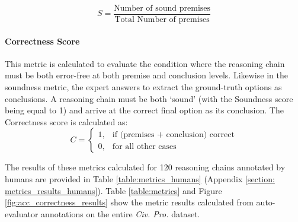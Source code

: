 \[
S = \frac{\text{Number of sound premises}}{\text{Total Number of premises}}
\]

\paragraph{Correctness Score} This metric is calculated to evaluate the condition where the reasoning chain must be both error-free at both premise and conclusion levels. Likewise in the soundness metric, the expert answers to extract the ground-truth options as conclusions. A reasoning chain must be both `sound' (with the Soundness score being equal to 1) and arrive at the correct final option as its conclusion. The Correctness score is calculated as:
\[
C =
\begin{cases} 
1, & \text{if (premises +  conclusion) correct} \\
0, & \text{for all other cases} 
\end{cases}
\]

The results of these metrics calculated for 120 reasoning chains annotated by humans are provided in Table \ref{table:metrics_humans} (Appendix \ref{section: metrics_results_humans}). Table \ref{table:metrics} and Figure \ref{fig:acc_correctness_results} show the metric results calculated from auto-evaluator annotations on the entire \textit{Civ. Pro.} dataset.

